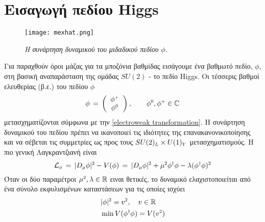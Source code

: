 \section{Εισαγωγή πεδίου Higgs}
\begin{figure}[t] 
    \centering
    \texttt{[image: mexhat.png]}
    \caption{\textit{Η συνάρτηση δυναμικού του μιδαδικού πεδίου $\phi$.}}
    \label{fig:mexhat}
\end{figure}
Για παραχθούν όροι μάζας για τα μποζόνια βαθμίδας 
εισάγουμε ένα βαθμωτό πεδίο, $\phi$, στη βασική αναπαράσταση της ομάδας $SU(2)$ - το πεδίο Higgs. Οι τέσσερις βαθμοί ελευθερίας (β.ε.) του πεδίου $\phi$ 
\begin{equation}\label{scalar SU doublet}
    \phi\,=\,\left(\begin{array}{c} \phi\superscr{+}\\ \phi\superscr{0} \end{array}\right), \qquad\phi\superscr{0},\phi\superscr{+}\in\mathbb{C}
\end{equation}
μετασχηματίζονται σύμφωνα με την \eqref{electroweak transformation}.
Η συνάρτηση δυναμικού του πεδίου πρέπει να ικανοποιεί τις ιδιότητες της επανακανονικοποίησης και να σέβεται τις συμμετρίες ως προς τους $SU(2)\subscr{L}\times U(1)\subscr{Y}$ μετασχηματισμούς. Η πιο γενική Λαγκραντζιανή 
είναι
\begin{equation}\label{scalar boson lagragian}
    \mathcal{L}\subscr{\phi}\,=\,|D\subscr{\mu}\phi|\superscr{2}-V(\phi)\,=\,|D\subscr{\mu}\phi|\superscr{2}+\mu\superscr{2}\phi\superscr{\dagger}\phi - \lambda(\phi\superscr{\dagger}\phi)\superscr{2}
\end{equation}
Όταν οι δύο παραμέτροι $\mu\superscr{2},\lambda\in\mathbb{R}$ ειναι θετικές, το δυναμικό ελαχιστοποιείται από ένα σύνολο εκφυλισμένων καταστάσεων για τις οποίες ισχύει
\begin{equation}
\begin{split}
    &|\phi|\superscr{2}=v\superscr{2},\quad v\in \mathbb{R}\\
    &\min V(\phi\superscr{\dagger}\phi)=V(v\superscr{2})
\end{split}
\end{equation}
\\

